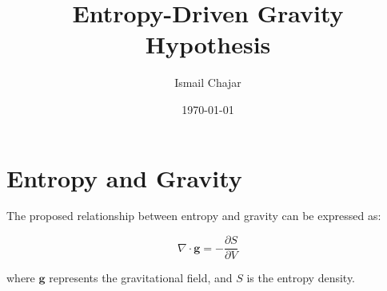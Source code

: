 \documentclass{article}
\begin{document}
    \title{Entropy-Driven Gravity Hypothesis}
    \author{Ismail Chajar}
    \date{\today}
    \maketitle

    \section{Entropy and Gravity}
    The proposed relationship between entropy and gravity can be expressed as:

    \begin{equation}
        \nabla \cdot \mathbf{g} = -\frac{\partial S}{\partial V}
    \end{equation}

    where \( \mathbf{g} \) represents the gravitational field, and \( S \) is the entropy density.

    
\end{document}
